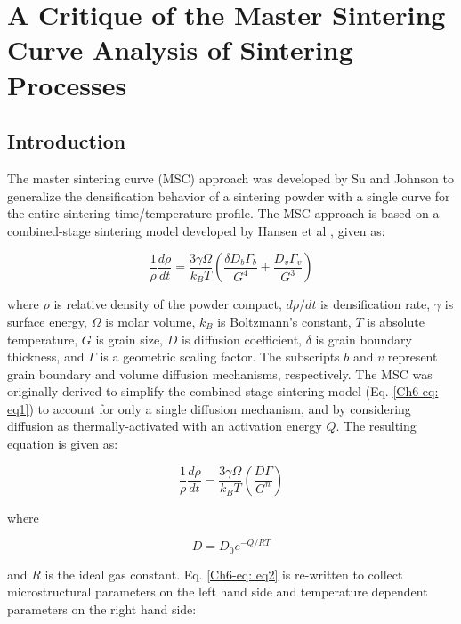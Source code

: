 \chapter{A Critique of the Master Sintering Curve Analysis of Sintering Processes}

\section{Introduction}
The master sintering curve (MSC) approach was developed by Su and Johnson\cite{Su1996a} to generalize the densification behavior of a sintering powder with a single curve for the entire sintering time/temperature profile. The MSC approach is based on a combined-stage sintering model developed by Hansen et al \cite{Hansen1992}, given as:

\begin{equation}
\label{Ch6-eq: eq1}
\frac{1}{\rho} \frac{d\rho}{dt} = \frac{3 \gamma \Omega}{k_{B}T} \left( \frac{\delta D_{b} \Gamma_{b}}{G^{4}} + \frac{D_{v} \Gamma_{v}}{G^{3}} \right)
\end{equation}

\noindent where $\rho$ is relative density of the powder compact, $d\rho/dt$ is densification rate, $\gamma$ is surface energy, $\Omega$ is molar volume, $k_{B}$ is Boltzmann's constant, $T$ is absolute temperature, $G$ is grain size, $D$ is diffusion coefficient, $\delta$ is grain boundary thickness, and $\Gamma$ is a geometric scaling factor. The subscripts $b$ and $v$ represent grain boundary and volume diffusion mechanisms, respectively. The MSC was originally derived to simplify the combined-stage sintering model (Eq. \ref{Ch6-eq: eq1}) to account for only a single diffusion mechanism, and by considering diffusion as thermally-activated with an activation energy $Q$. The resulting equation is given as:

\begin{equation}
\label{Ch6-eq: eq2}
\frac{1}{\rho} \frac{d\rho}{dt} = \frac{3 \gamma \Omega}{k_{B}T} \left( \frac{D \Gamma}{G^{n}} \right)
\end{equation}

\noindent where

\begin{equation}
\label{Ch6-eq: eq3}
D = D_{0}e^{-Q/RT}
\end{equation}

\noindent and $R$ is the ideal gas constant. Eq. \ref{Ch6-eq: eq2} is re-written to collect microstructural parameters on the left hand side and temperature dependent parameters on the right hand side:


